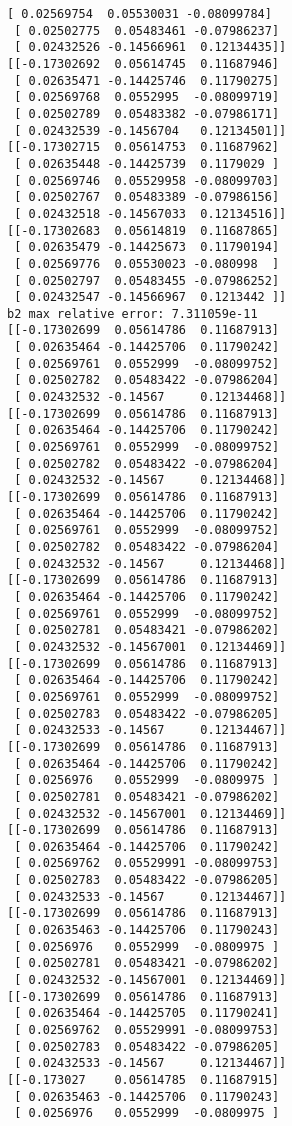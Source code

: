 \documentclass[11pt]{article}
\begin{document}
\begin{Verbatim}[commandchars=\\\{\}]
 [ 0.02569754  0.05530031 -0.08099784]
 [ 0.02502775  0.05483461 -0.07986237]
 [ 0.02432526 -0.14566961  0.12134435]]
[[-0.17302692  0.05614745  0.11687946]
 [ 0.02635471 -0.14425746  0.11790275]
 [ 0.02569768  0.0552995  -0.08099719]
 [ 0.02502789  0.05483382 -0.07986171]
 [ 0.02432539 -0.1456704   0.12134501]]
[[-0.17302715  0.05614753  0.11687962]
 [ 0.02635448 -0.14425739  0.1179029 ]
 [ 0.02569746  0.05529958 -0.08099703]
 [ 0.02502767  0.05483389 -0.07986156]
 [ 0.02432518 -0.14567033  0.12134516]]
[[-0.17302683  0.05614819  0.11687865]
 [ 0.02635479 -0.14425673  0.11790194]
 [ 0.02569776  0.05530023 -0.080998  ]
 [ 0.02502797  0.05483455 -0.07986252]
 [ 0.02432547 -0.14566967  0.1213442 ]]
b2 max relative error: 7.311059e-11
[[-0.17302699  0.05614786  0.11687913]
 [ 0.02635464 -0.14425706  0.11790242]
 [ 0.02569761  0.0552999  -0.08099752]
 [ 0.02502782  0.05483422 -0.07986204]
 [ 0.02432532 -0.14567     0.12134468]]
[[-0.17302699  0.05614786  0.11687913]
 [ 0.02635464 -0.14425706  0.11790242]
 [ 0.02569761  0.0552999  -0.08099752]
 [ 0.02502782  0.05483422 -0.07986204]
 [ 0.02432532 -0.14567     0.12134468]]
[[-0.17302699  0.05614786  0.11687913]
 [ 0.02635464 -0.14425706  0.11790242]
 [ 0.02569761  0.0552999  -0.08099752]
 [ 0.02502782  0.05483422 -0.07986204]
 [ 0.02432532 -0.14567     0.12134468]]
[[-0.17302699  0.05614786  0.11687913]
 [ 0.02635464 -0.14425706  0.11790242]
 [ 0.02569761  0.0552999  -0.08099752]
 [ 0.02502781  0.05483421 -0.07986202]
 [ 0.02432532 -0.14567001  0.12134469]]
[[-0.17302699  0.05614786  0.11687913]
 [ 0.02635464 -0.14425706  0.11790242]
 [ 0.02569761  0.0552999  -0.08099752]
 [ 0.02502783  0.05483422 -0.07986205]
 [ 0.02432533 -0.14567     0.12134467]]
[[-0.17302699  0.05614786  0.11687913]
 [ 0.02635464 -0.14425706  0.11790242]
 [ 0.0256976   0.0552999  -0.0809975 ]
 [ 0.02502781  0.05483421 -0.07986202]
 [ 0.02432532 -0.14567001  0.12134469]]
[[-0.17302699  0.05614786  0.11687913]
 [ 0.02635464 -0.14425706  0.11790242]
 [ 0.02569762  0.05529991 -0.08099753]
 [ 0.02502783  0.05483422 -0.07986205]
 [ 0.02432533 -0.14567     0.12134467]]
[[-0.17302699  0.05614786  0.11687913]
 [ 0.02635463 -0.14425706  0.11790243]
 [ 0.0256976   0.0552999  -0.0809975 ]
 [ 0.02502781  0.05483421 -0.07986202]
 [ 0.02432532 -0.14567001  0.12134469]]
[[-0.17302699  0.05614786  0.11687913]
 [ 0.02635464 -0.14425705  0.11790241]
 [ 0.02569762  0.05529991 -0.08099753]
 [ 0.02502783  0.05483422 -0.07986205]
 [ 0.02432533 -0.14567     0.12134467]]
[[-0.173027    0.05614785  0.11687915]
 [ 0.02635463 -0.14425706  0.11790243]
 [ 0.0256976   0.0552999  -0.0809975 ]

\end{Verbatim}
\end{document}
